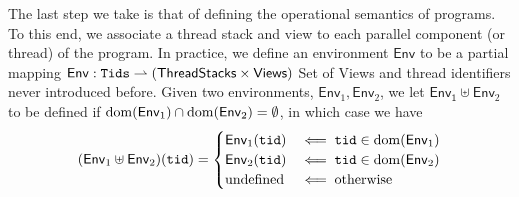 \documentclass[a4paper,UKenglish]{article}%
\theoremstyle{plain}
\begin{document}
%
%
%
The last step we take is that of defining the operational semantics of 
programs.
To this end, we associate a thread stack and view to each parallel component (or thread) of the program. 
In practice, we define an environment $\mathsf{Env}$ to be 
a partial mapping $\mathsf{Env} : \mathtt{Tids} \rightharpoonup (\mathsf{ThreadStacks} \times \mathsf{Views})$ 
\ac{Set of Views and thread identifiers never introduced before.} 
Given two environments, $\mathsf{Env}_1, \mathsf{Env}_2$, we let 
$\mathsf{Env_1} \uplus \mathsf{Env}_2$ to be defined if 
$\operatorname{dom}(\mathsf{Env}_1) \cap \operatorname{dom}(\mathsf{Env}_2) = \emptyset$, 
in which case we have 
\[
(\mathsf{Env}_1 \uplus \mathsf{Env}_2)(\mathtt{tid}) = \begin{cases}
\mathsf{Env}_1(\mathtt{tid}) & \impliedby \mathtt{tid} \in \operatorname{dom}(\mathsf{Env}_1)\\
\mathsf{Env}_2(\mathtt{tid}) & \impliedby \mathtt{tid} \in \operatorname{dom}(\mathsf{Env}_2)\\
\text{undefined} & \impliedby \text{otherwise}
\end{cases}
\]

\end{document}
